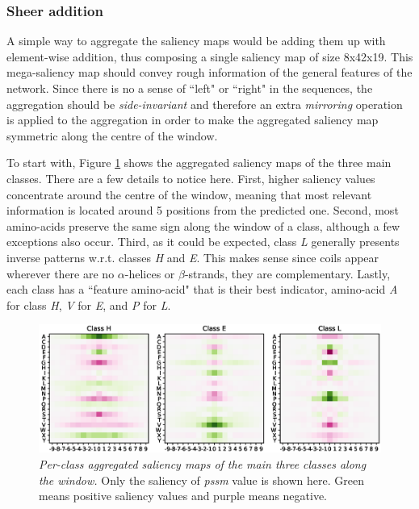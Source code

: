 		\subsubsection*{Sheer addition} \label{sect:sheer}
		A simple way to aggregate the saliency maps would be adding them up with element-wise addition, thus composing a single saliency map of size 8x42x19. This mega-saliency map should convey rough information of the general features of the network. Since there is no a sense of ``left" or ``right" in the sequences, the aggregation should be \textit{side-invariant} and therefore an extra \textit{mirroring} operation is applied to the aggregation in order to make the aggregated saliency map symmetric along the centre of the window.
		
		To start with, Figure \ref{fig:class_agg_class} shows the aggregated saliency maps of the three main classes. There are a few details to notice here. First, higher saliency values concentrate around the centre of the window, meaning that most relevant information is located around 5 positions from the predicted one. Second, most amino-acids preserve the same sign along the window of a class, although a few exceptions also occur. Third, as it could be expected, class \textit{L} generally presents inverse patterns w.r.t. classes \textit{H} and \textit{E}. This makes sense since coils appear wherever there are no $\alpha$-helices or $\beta$-strands, they are complementary. Lastly, each class has a ``feature amino-acid" that is their best indicator, amino-acid \textit{A} for class \textit{H}, \textit{V} for \textit{E}, and \textit{P} for \textit{L}.
		
		\begin{figure}
			\centering
			\includegraphics[width=1\linewidth]{Figures/class_agg_class}
			\caption{\textit{Per-class aggregated saliency maps of the main three classes along the window.} Only the saliency of \textit{pssm} value is shown here. Green means positive saliency values and purple means negative.}
			\label{fig:class_agg_class}
		\end{figure}
		
